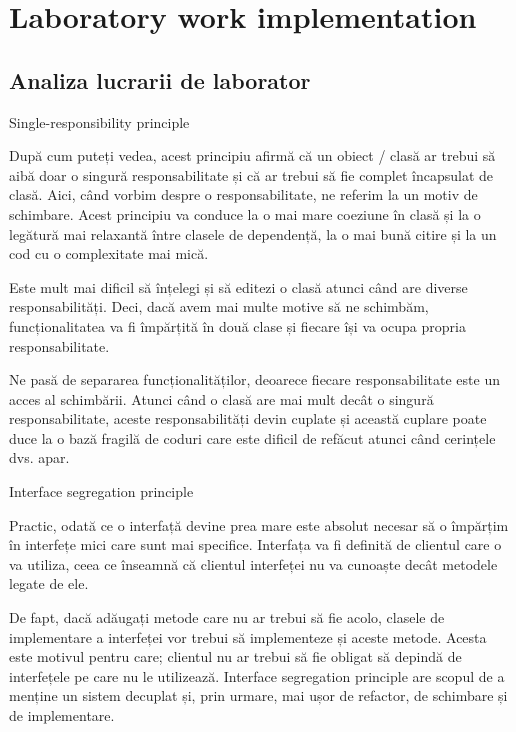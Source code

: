 \section{Laboratory work implementation}

\subsection{Analiza lucrarii de laborator}

Single-responsibility principle

După cum puteți vedea, acest principiu afirmă că un obiect / clasă ar trebui să aibă doar o singură responsabilitate și că ar trebui să fie complet încapsulat de clasă. Aici, când vorbim despre o responsabilitate, ne referim la un motiv de schimbare. Acest principiu va conduce la o mai mare coeziune în clasă și la o legătură mai relaxantă între clasele de dependență, la o mai bună citire și la un cod cu o complexitate mai mică.

Este mult mai dificil să înțelegi și să editezi o clasă atunci când are diverse responsabilități. Deci, dacă avem mai multe motive să ne schimbăm, funcționalitatea va fi împărțită în două clase și fiecare își va ocupa propria responsabilitate.

Ne pasă de separarea funcționalităților, deoarece fiecare responsabilitate este un acces al schimbării. Atunci când o clasă are mai mult decât o singură responsabilitate, aceste responsabilități devin cuplate și această cuplare poate duce la o bază fragilă de coduri care este dificil de refăcut atunci când cerințele dvs. apar.

Interface segregation principle

Practic, odată ce o interfață devine prea mare  este absolut necesar să o împărțim în interfețe mici care sunt mai specifice. Interfața va fi definită de clientul care o va utiliza, ceea ce înseamnă că clientul interfeței nu va cunoaște decât metodele legate de ele.

De fapt, dacă adăugați metode care nu ar trebui să fie acolo, clasele de implementare a interfeței vor trebui să implementeze și aceste metode. Acesta este motivul pentru care; clientul nu ar trebui să fie obligat să depindă de interfețele pe care nu le utilizează. Interface segregation principle are scopul de a menține un sistem decuplat și, prin urmare, mai ușor de refactor, de schimbare și de implementare.


\clearpage